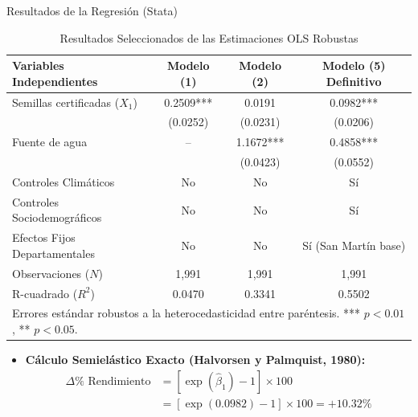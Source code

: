 \documentclass[t]{beamer}
\begin{document}
\begin{frame}{Resultados de la Regresión (Stata)}
\hspace{0.2cm}
\begin{minipage}{0.92\textwidth}
\vspace{-0.55cm}
    \begin{table}
        \centering
        \caption{Resultados Seleccionados de las Estimaciones OLS Robustas}
        \scriptsize
        \renewcommand{\arraystretch}{1.05}
        \begin{tabular}{lccc}
            \hline
            \textbf{Variables Independientes} & \textbf{Modelo (1)} & \textbf{Modelo (2)} & \textbf{Modelo (5) Definitivo} \\ \hline
            Semillas certificadas ($X_1$)  & 0.2509*** & 0.0191 & 0.0982*** \\
                                           & (0.0252)  & (0.0231) & (0.0206) \\
            Fuente de agua                 & --        & 1.1672*** & 0.4858*** \\
                                           &           & (0.0423)  & (0.0552) \\ \hline
            Controles Climáticos           & No        & No        & Sí \\
            Controles Sociodemográficos    & No        & No        & Sí \\
            Efectos Fijos Departamentales  & No        & No        & Sí (San Martín base) \\ \hline
            Observaciones ($N$)            & 1,991     & 1,991     & 1,991 \\
            R-cuadrado ($R^2$)             & 0.0470    & 0.3341    & 0.5502 \\ \hline
            \multicolumn{4}{l}{\tiny Errores estándar robustos a la heterocedasticidad entre paréntesis. *** $p<0.01$, ** $p<0.05$.}
        \end{tabular}
    \end{table}

    \begin{itemize}
        \justifying
        \item \textbf{Cálculo Semielástico Exacto (Halvorsen y Palmquist, 1980):}
        \vspace{-0.15cm}
        \begin{align*}
        \Delta\% \text{ Rendimiento} &= \left[\exp(\hat{\beta}_1) - 1\right] \times 100 \\
        &= [\exp(0.0982) - 1] \times 100 = \mathbf{+10.32\%}
        \end{align*}
    \end{itemize}

\end{minipage}
\end{frame}
\end{document}
